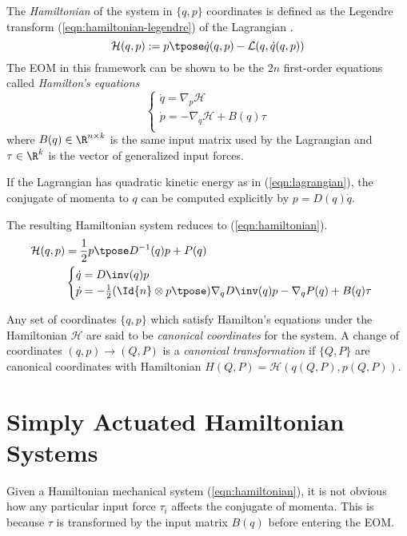 The \textit{Hamiltonian} of the system in
\(\{q,p\}\) coordinates is defined as the Legendre transform 
(\ref{eqn:hamiltonian-legendre}) of the Lagrangian \cite{landau_mechanics}.
\begin{equation}\label{eqn:hamiltonian-legendre}
    \mathcal{H}(q,p) := p\tpose \dot{q}(q,p) - \mathcal{L}(q,\dot{q}(q,p))
\end{equation}
The EOM in this framework can be shown to be the \(2n\)
first-order equations called \textit{Hamilton's equations}
\begin{equation}\label{eqn:hamiltons-eqns}
    \begin{cases}
        \dot{q} = \nabla_p\mathcal{H} \\
        \dot{p} = -\nabla_q\mathcal{H} + B(q)\tau \\
    \end{cases}
\end{equation}
where \(B(q) \in \R^{n\times k}\) is the same input matrix used by the
Lagrangian and \(\tau \in \R^k\) is the vector of generalized input forces.

If the Lagrangian has quadratic kinetic energy as in (\ref{eqn:lagrangian}), 
the conjugate of
momenta to \(q\) can be computed explicitly by \(p = D(q)\dot{q}\).

The resulting Hamiltonian system reduces to (\ref{eqn:hamiltonian}).
\begin{align}\label{eqn:hamiltonian}
    \mathcal{H}(q,p) &= \frac{1}{2} p\tpose D^{-1}(q) p + P(q) \\
                     &\begin{cases}
        \dot{q} = D\inv(q)p \\
        \dot{p} = -\frac{1}{2} (\Id{n} \otimes p\tpose) \nabla_q D\inv(q) p
        - \nabla_q P(q) + B(q) \tau \\
    \end{cases} 
\end{align}

Any set of coordinates \(\{q,p\}\) which satisfy Hamilton's equations 
under the Hamiltonian \(\mathcal{H}\) are
said to be \textit{canonical coordinates} for the system. A change of
coordinates \((q,p) \rightarrow (Q,P)\) is a \textit{canonical
transformation} if \(\{Q,P\}\) are canonical coordinates with Hamiltonian
\(H(Q,P) = \mathcal{H}\left(q(Q,P), p(Q,P)\right)\).

\section{Simply Actuated Hamiltonian Systems}
Given a Hamiltonian mechanical system (\ref{eqn:hamiltonian}), it is not obvious
how any particular input force \(\tau_i\) affects the conjugate of momenta. 
This is because \(\tau\) is transformed by the input matrix \(B(q)\) before
entering the EOM.

